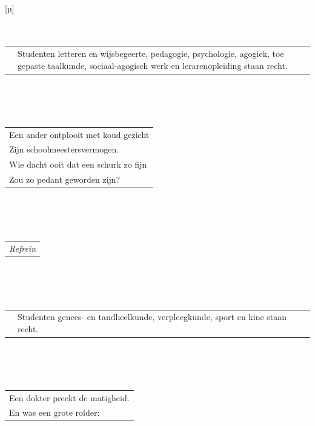 \documentclass[a4paper, 14pt]{extarticle}
\begin{document}
\\\\\\
[µ]
\\\\\\
\begin{tabularx}{\textwidth} {
   c >{\raggedright\arraybackslash}X}
    \hspace{5mm} & {\small Studenten letteren en wijsbegeerte, pedagogie, psychologie, agogiek, toe
gepaste taalkunde, sociaal-agogisch werk en lerarenopleiding staan recht.}\\
\end{tabularx}
\\\\\\
\begin{tabularx}{0.7\textwidth} {
   >{\raggedright\arraybackslash}X }
Een ander ontplooit met koud gezicht\\
Zijn schoolmeestersvermogen.\\
Wie dacht ooit dat een schurk zo fijn\\
Zou zo pedant geworden zijn?\\
\end{tabularx}
\\\\\\
\begin{tabularx}{0.7\textwidth} {
   >{\raggedright\arraybackslash}X }
   \textit{Refrein}\\
\end{tabularx}
\\\\\\
\begin{tabularx}{\textwidth} {
   c >{\raggedright\arraybackslash}X}
    \hspace{5mm} & {\small Studenten genees- en tandheelkunde, verpleegkunde, sport en kine staan
recht.}\\
\end{tabularx}
\\\\\\
\begin{tabularx}{0.7\textwidth} {
   >{\raggedright\arraybackslash}X }
   Een dokter preekt de matigheid.\\
En was een grote rolder:\\
\end{tabularx}
\end{document}
